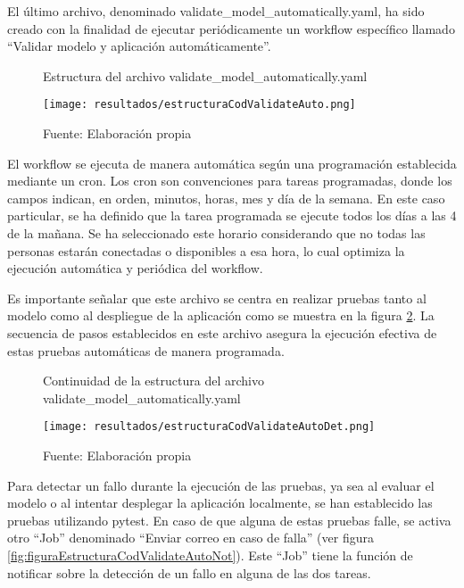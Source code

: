 \newpage

El último archivo, denominado validate\_model\_automatically.yaml, ha sido creado con la finalidad de ejecutar periódicamente un workflow específico llamado ``Validar modelo y aplicación automáticamente''.

\begin{figure}[h]
	\centering
	\caption{Estructura del archivo validate\_model\_automatically.yaml}
	\texttt{[image: resultados/estructuraCodValidateAuto.png]}
	\caption*{\footnotesize Fuente: Elaboración propia}
	\label{fig:figuraEstructuraCodValidateAuto}
\end{figure}

El workflow se ejecuta de manera automática según una programación establecida mediante un cron. Los cron son convenciones para tareas programadas, donde los campos indican, en orden, minutos, horas, mes y día de la semana. En este caso particular, se ha definido que la tarea programada se ejecute todos los días a las 4 de la mañana. Se ha seleccionado este horario considerando que no todas las personas estarán conectadas o disponibles a esa hora, lo cual optimiza la ejecución automática y periódica del workflow. \newline

Es importante señalar que este archivo se centra en realizar pruebas tanto al modelo como al despliegue de la aplicación como se muestra en la figura \ref{fig:figuraEstructuraCodValidateAutoDet}. La secuencia de pasos establecidos en este archivo asegura la ejecución efectiva de estas pruebas automáticas de manera programada.

\newpage

\begin{figure}[h]
	\centering
	\caption{Continuidad de la estructura del archivo validate\_model\_automatically.yaml}
	\texttt{[image: resultados/estructuraCodValidateAutoDet.png]}
	\caption*{\footnotesize Fuente: Elaboración propia}
	\label{fig:figuraEstructuraCodValidateAutoDet}
\end{figure}

Para detectar un fallo durante la ejecución de las pruebas, ya sea al evaluar el modelo o al intentar desplegar la aplicación localmente, se han establecido las pruebas utilizando pytest. En caso de que alguna de estas pruebas falle, se activa otro ``Job'' denominado ``Enviar correo en caso de falla'' (ver figura \ref{fig:figuraEstructuraCodValidateAutoNot}). Este ``Job'' tiene la función de notificar sobre la detección de un fallo en alguna de las dos tareas.

